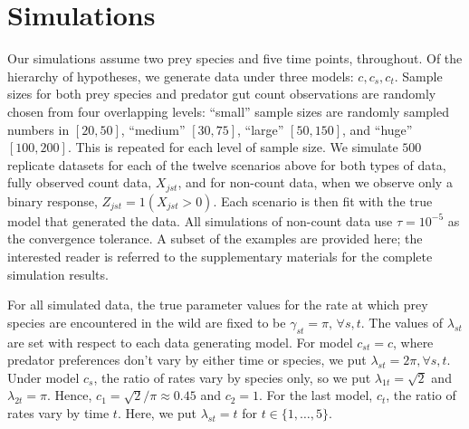 \section{Simulations}
\label{sec:sim}


Our simulations assume two prey species and five time points, throughout.  Of the hierarchy of hypotheses, we generate data under three models: $c, c_s, c_t$.  Sample sizes for both prey species and predator gut count observations are randomly chosen from four overlapping levels: ``small'' sample sizes are randomly sampled numbers in $[20,50]$, ``medium'' $[30,75]$, ``large'' $[50,150]$, and ``huge'' $[100,200]$.  This is repeated for each level of sample size.  We simulate $500$ replicate datasets for each of the twelve scenarios above for both types of data, fully observed count data, $X_{jst}$, and for non-count data, when we observe only a binary response, $Z_{jst} = 1(X_{jst}>0)$.  Each scenario is then fit with the true model that generated the data.  All simulations of non-count data use $\tau = 10^{-5}$ as the convergence tolerance.  A subset of the examples are provided here; the interested reader is referred to the supplementary materials for the complete simulation results.

For all simulated data, the true parameter values for the rate at which prey species are encountered in the wild are fixed to be $\gamma_{st} = \pi, \, \forall s,t$. The values of $\lambda_{st}$ are set with respect to each data generating model.  For model $c_{st} = c$, where predator preferences don't vary by either time or species, we put $\lambda_{st} = 2\pi, \forall s,t$.  Under model $c_s$, the ratio of rates vary by species only, so we put $\lambda_{1t} = \sqrt{2}$ and $\lambda_{2t} = \pi$.  Hence, $c_1 = \sqrt{2}/\pi \approx 0.45$ and $c_2 = 1$.  For the last model, $c_t$, the ratio of rates vary by time $t$.  Here, we put $\lambda_{st} = t$ for $t \in \{1, \ldots, 5 \}$.  

